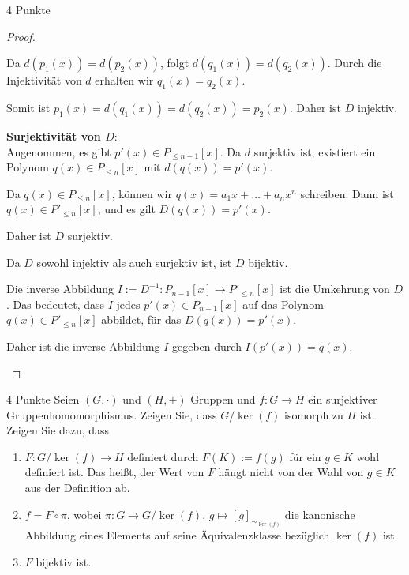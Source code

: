 \documentclass{../problemset}
\begin{document}
\begin{problem}{4 Punkte}
\begin{proof}
\begin{enumerate}
		      Da $d(p_1(x)) = d(p_2(x))$, folgt $d(q_1(x)) = d(q_2(x))$. Durch die Injektivität von $d$ erhalten wir $q_1(x) = q_2(x)$.

		      Somit ist $p_1(x) = d(q_1(x)) = d(q_2(x)) = p_2(x)$. Daher ist $D$ injektiv.
		      \checkmark

		      \textbf{Surjektivität von $D$}: \\
		      Angenommen, es gibt $p'(x) \in P_{\le n-1}[x]$. Da $d$ surjektiv ist, existiert ein Polynom $q(x) \in P_{\le n}[x]$ mit $d(q(x)) = p'(x)$.

		      Da $q(x) \in P_{\le n}[x]$, können wir $q(x) = a_1x + \ldots + a_nx^n$ schreiben. Dann ist $q(x) \in P'_{\le n}[x]$, und es gilt $D(q(x)) = p'(x)$.

		      Daher ist $D$ surjektiv.
		      \checkmark

		      Da $D$ sowohl injektiv als auch surjektiv ist, ist $D$ bijektiv.

		      Die inverse Abbildung $I := D^{-1}: P_{n-1}[x] \to P'_{\le n}[x]$ ist die Umkehrung von $D$. Das bedeutet, dass $I$ jedes $p'(x) \in P_{n-1}[x]$ auf das Polynom $q(x) \in P'_{\le n}[x]$ abbildet, für das $D(q(x)) = p'(x)$.

		      Daher ist die inverse Abbildung $I$ gegeben durch $I(p'(x)) = q(x)$.
	\end{enumerate}
\end{proof}

\end{problem}

\begin{problem}{4 Punkte}
Seien $(G, \cdot)$ und $(H, +)$ Gruppen und $f: G \to H$ ein surjektiver Gruppenhomomorphismus. Zeigen Sie, dass $G/\ker(f)$ isomorph zu $H$ ist. Zeigen Sie dazu, dass
\begin{enumerate}
	\item $F: G/\ker(f) \to H$ definiert durch $F(K) := f(g)$ für ein $g \in K$ wohl definiert ist. Das heißt, der Wert von $F$ hängt nicht von der Wahl von $g \in K$ aus der Definition ab.
	\item $f = F \circ \pi$, wobei $\pi: G \to G/\ker(f)$, $g \mapsto [g]_{\sim_{\ker(f)}}$ die kanonische Abbildung eines Elements auf seine Äquivalenzklasse bezüglich $\ker(f)$ ist.
	\item $F$ bijektiv ist.
\end{enumerate}

\end{problem}
\end{document}
